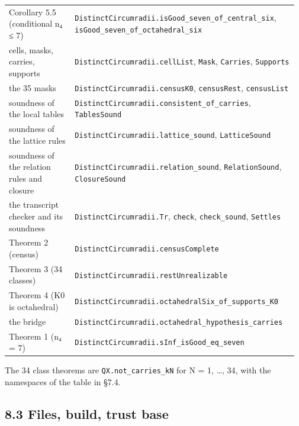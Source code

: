 \documentclass[11pt,a4paper]{article}
\theoremstyle{named}
\begin{document}
\begin{small}
\begin{longtable}{>{\raggedright\arraybackslash}p{0.229\linewidth}>{\raggedright\arraybackslash}p{0.743\linewidth}}
Corollary 5.5 (conditional n₄ ≤ 7) & \texttt{DistinctCircumradii.\allowbreak{}isGood\_\allowbreak{}seven\_\allowbreak{}of\_\allowbreak{}central\_\allowbreak{}six}, \texttt{isGood\_\allowbreak{}seven\_\allowbreak{}of\_\allowbreak{}octahedral\_\allowbreak{}six} \\
cells, masks, carries, supports & \texttt{DistinctCircumradii.\allowbreak{}cellList}, \texttt{Mask}, \texttt{Carries}, \texttt{Supports} \\
the 35 masks & \texttt{DistinctCircumradii.\allowbreak{}censusK0}, \texttt{censusRest}, \texttt{censusList} \\
soundness of the local tables & \texttt{DistinctCircumradii.\allowbreak{}consistent\_\allowbreak{}of\_\allowbreak{}carries}, \texttt{TablesSound} \\
soundness of the lattice rules & \texttt{DistinctCircumradii.\allowbreak{}lattice\_\allowbreak{}sound}, \texttt{LatticeSound} \\
soundness of the relation rules and closure & \texttt{DistinctCircumradii.\allowbreak{}relation\_\allowbreak{}sound}, \texttt{RelationSound}, \texttt{ClosureSound} \\
the transcript checker and its soundness & \texttt{DistinctCircumradii.\allowbreak{}Tr}, \texttt{check}, \texttt{check\_\allowbreak{}sound}, \texttt{Settles} \\
Theorem 2 (census) & \texttt{DistinctCircumradii.\allowbreak{}censusComplete} \\
Theorem 3 (34 classes) & \texttt{DistinctCircumradii.\allowbreak{}restUnrealizable} \\
Theorem 4 (K0 is octahedral) & \texttt{DistinctCircumradii.\allowbreak{}octahedralSix\_\allowbreak{}of\_\allowbreak{}supports\_\allowbreak{}K0} \\
the bridge & \texttt{DistinctCircumradii.\allowbreak{}octahedral\_\allowbreak{}hypothesis\_\allowbreak{}carries} \\
Theorem 1 (n₄ = 7) & \texttt{DistinctCircumradii.\allowbreak{}sInf\_\allowbreak{}isGood\_\allowbreak{}eq\_\allowbreak{}seven} \\
\hline
\end{longtable}
\end{small}

The 34 class theorems are \texttt{QX.\allowbreak{}not\_\allowbreak{}carries\_\allowbreak{}kN} for N = 1, …, 34, with the namespaces of the table in §7.4.

\subsection*{8.3 Files, build, trust base}
\end{document}
